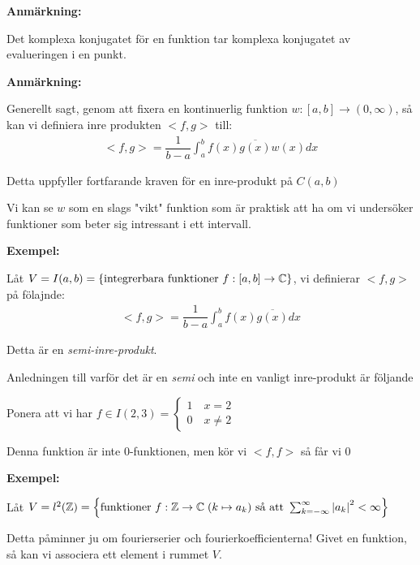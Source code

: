 \par\bigskip
\noindent\textbf{Anmärkning:}\par
\noindent Det komplexa konjugatet för en funktion tar komplexa konjugatet av evalueringen i en punkt.
\par\bigskip
\noindent\textbf{Anmärkning:}\par
\noindent Generellt sagt, genom att fixera en kontinuerlig funktion $w:[a,b]\to(0,\infty)$, så kan vi definiera inre produkten $<f,g>$ till:
\begin{equation*}
  \begin{gathered}
    <f,g> = \dfrac{1}{b-a}\int_{a}^{b}f(x)\overline{g(x)}w(x)dx
  \end{gathered}
\end{equation*}\par
\noindent Detta uppfyller fortfarande kraven för en inre-produkt på $C(a,b)$\par
\noindent Vi kan se $w$ som en slags "vikt" funktion som är praktisk att ha om vi undersöker funktioner som beter sig intressant i ett intervall. 
\par\bigskip
\noindent\textbf{Exempel:}\par
\noindent Låt $V = I(a,b) = \left\{\text{integrerbara funktioner } f:[a,b]\to\mathbb{C}\right\}$, vi definierar $<f,g>$ på fölajnde:
\begin{equation*}
  \begin{gathered}
    <f,g> = \dfrac{1}{b-a}\int_{a}^{b}f(x)\overline{g(x)}dx
  \end{gathered}
\end{equation*}\par
\noindent Detta är en \textit{semi-inre-produkt}.\par
\noindent Anledningen till varför det är en \textit{semi} och inte en vanligt inre-produkt är följande\par
Ponera att vi har $f\in I(2,3) = \begin{cases}1\quad x=2\\0\quad x\neq2\end{cases}$\par
Denna funktion är inte 0-funktionen, men kör vi $<f,f>$ så får vi 0
\par\bigskip
\noindent\textbf{Exempel:}\par
\noindent Låt $V = l^2(\mathbb{Z}) = \left\{\text{funktioner } f:\mathbb{Z}\to\mathbb{C}\;(k\mapsto a_k)\text{ så att } \sum_{k=-\infty}^{\infty}\left|a_k\right|^2<\infty\right\}$
\par\bigskip
\noindent Detta påminner ju om fourierserier och fourierkoefficienterna! Givet en funktion, så kan vi associera ett element i rummet $V$.\par
